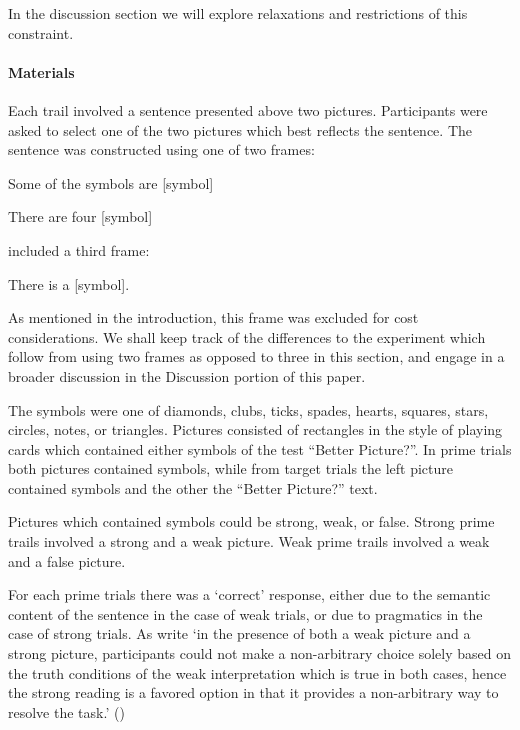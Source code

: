\documentclass[10pt]{article}
\begin{document}
\begin{multicols}{2}
In the discussion section we will explore relaxations and restrictions of this constraint.

\paragraph{Materials}

Each trail involved a sentence presented above two pictures.
Participants were asked to select one of the two pictures which best reflects the sentence.
The sentence was constructed using one of two frames:
\begin{enumerate*}[label=(\roman*)]
\item Some of the symbols are [symbol]
\item There are four [symbol]
\end{enumerate*}
\citeauthor{Bott:2016aa} included a third frame:
\begin{enumerate*}[label=(\roman*), resume]
\item There is a [symbol].
\end{enumerate*}
As mentioned in the introduction, this frame was excluded for cost considerations.
We shall keep track of the differences to the experiment which follow from using two frames as opposed to three in this section, and engage in a broader discussion in the Discussion portion of this paper.

The symbols were one of diamonds, clubs, ticks, spades, hearts, squares, stars, circles, notes, or triangles.
Pictures consisted of rectangles in the style of playing cards which contained either symbols of the test ``Better Picture?''.
In prime trials both pictures contained symbols, while from target trials the left picture contained symbols and the other the ``Better Picture?'' text.

Pictures which contained symbols could be strong, weak, or false.
Strong prime trails involved a strong and a weak picture.
Weak prime trails involved a weak and a false picture.

For each prime trials there was a `correct' response, either due to the semantic content of the sentence in the case of weak trials, or due to pragmatics in the case of strong trials.
As \citeauthor{Bott:2016aa} write `in the presence of both a weak picture and a strong picture, participants could not make a non-arbitrary choice solely based on the truth conditions of the weak interpretation which is true in both cases, hence the strong reading is a favored option in that it provides a non-arbitrary way to resolve the task.' (\citeyear[124]{Bott:2016aa})


\end{multicols}
\end{document}

